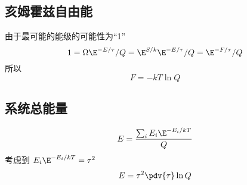 
\subsection{亥姆霍兹自由能}
由于最可能的能级的可能性为“1”
\begin{equation}
1 = \Omega \E^{-E/\tau}/Q = \E^{S/k} \E^{- E/\tau}/Q = \E^{-F/\tau}/Q
\end{equation}
所以
\begin{equation}
F = -kT\ln Q
\end{equation}

\subsection{系统总能量}
\begin{equation}
E = \frac{\sum_i E_i \E^{-E_i/kT}}{Q}
\end{equation}
考虑到 $E_i \E^{-E_i/kT} = \tau^2$ %
\begin{equation}
E = \tau ^2\pdv{\tau} \ln Q
\end{equation}
